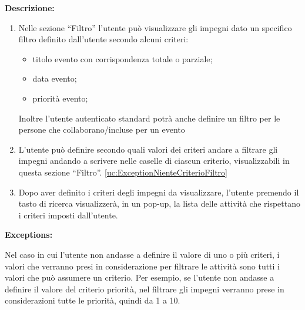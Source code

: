 \begin{listaPersonale}[UC]{}
    \textbf{Descrizione:}
    \begin{enumerate}
        \item Nelle sezione “Filtro” l'utente può visualizzare gli impegni dato un specifico filtro definito dall'utente secondo alcuni criteri:
              \begin{itemize}
                  \item titolo evento con corrispondenza totale o parziale;
                  \item data evento;
                  \item priorità evento;
              \end{itemize}
              Inoltre l'utente autenticato standard potrà anche definire un filtro per le persone che collaborano/incluse per un evento
        \item L'utente può definire secondo quali valori dei criteri andare a filtrare gli impegni andando a scrivere nelle caselle di ciascun criterio, visualizzabili in questa sezione “Filtro”. \ref{uc:ExceptionNienteCriterioFiltro}
        \item Dopo aver definito i criteri degli impegni da visualizzare, l'utente premendo il tasto di ricerca visualizzerà, in un pop-up, la lista delle attività che rispettano i criteri imposti dall'utente.

    \end{enumerate}

    \textbf{Exceptions:}
    \begin{enumerate}[label=\textbf{[exception \arabic{enumii}]}, ref= \textbf{[exception \arabic{enumii}]}]
         Nel caso in cui l'utente non andasse a definire il valore di uno o più criteri, i valori che verranno presi in considerazione per filtrare le attività sono tutti i valori che può assumere un criterio. Per esempio, se l'utente non andasse a definire il valore del criterio priorità, nel filtrare gli impegni verranno prese in considerazioni tutte le priorità, quindi da 1 a 10.
    \end{enumerate}





\end{listaPersonale}
